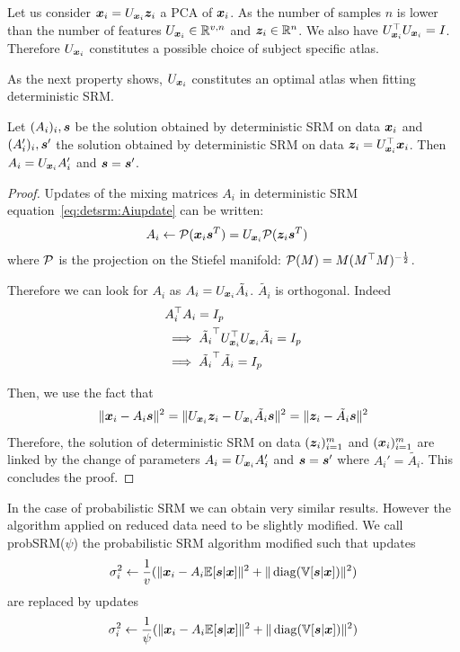 Let us consider $\boldsymbol{x}_i = U_{\boldsymbol{x}_i} \boldsymbol{z}_i$ a PCA of $\boldsymbol{x}_i$. As the number of
samples $n$ is lower than the number of features $U_{\boldsymbol{x}_i} \in \mathbb{R}^{v, n}$ and $\boldsymbol{z}_i \in \mathbb{R}^{n}$.  We also have $U_{\boldsymbol{x}_i}^{\top}U_{\boldsymbol{x}_i} = I$.
Therefore $U_{\boldsymbol{x}_i}$ constitutes a possible choice of subject specific atlas.

As the next property shows, $U_{\boldsymbol{x}_i}$ constitutes an optimal atlas when
fitting deterministic SRM.
\begin{prop}
  Let $(A_i)_i, \boldsymbol{s}$ be the solution obtained by deterministic SRM on data
  $\boldsymbol{x}_i$ and $(A_i')_i, \boldsymbol{s}'$ the solution obtained by deterministic SRM on
  data $\boldsymbol{z}_i = U_{\boldsymbol{x}_i}^{\top} \boldsymbol{x}_i$. Then $A_i = U_{\boldsymbol{x}_i}A_i'$ and $\boldsymbol{s} = \boldsymbol{s}'$. 
\label{prop:optimaldetsrm}
\end{prop}
\begin{proof}
Updates of the mixing matrices $A_i$ in deterministic SRM
equation~\eqref{eq:detsrm:Aiupdate} can be written:
\begin{align}
  A_i &\leftarrow \mathcal{P}(\boldsymbol{x}_i \boldsymbol{s}^T)= U_{\boldsymbol{x}_i}\mathcal{P}(\boldsymbol{z}_i \boldsymbol{s}^T)
  \label{eq:fastdetsrm:Aiupdate}
\end{align}
where $\mathcal{P}$ is the projection on the Stiefel manifold: $\mathcal{P}(M) = M
(M^{\top}M)^{-\frac12}$.


Therefore we can look for $A_i$ as $A_i = U_{\boldsymbol{x}_i} \tilde{A_i}$. $\tilde{A_i}$ is
orthogonal. Indeed
\begin{align}
  &A_i^{\top} A_i = I_p \\
  & \implies \tilde{A_i}^{\top}U_{\boldsymbol{x}_i}^{\top} U_{\boldsymbol{x}_i} \tilde{A_i} = I_p \\
  & \implies \tilde{A_i}^{\top} \tilde{A_i} = I_p
\end{align}

Then, we use the fact that
\begin{align}
  \|\boldsymbol{x}_i - A_i \boldsymbol{s} \|^2 = \| U_{\boldsymbol{x}_i}\boldsymbol{z}_i - U_{\boldsymbol{x}_i}\tilde{A_i} \boldsymbol{s}\|^2 = \| \boldsymbol{z}_i - \tilde{A_i} \boldsymbol{s} \|^2
  \label{eq:equality:xy}
\end{align}
Therefore, the solution of deterministic SRM on data $(\boldsymbol{z}_i)_{i=1}^m$ and
$(\boldsymbol{x}_i)_{i=1}^m$ are linked by the change of parameters $A_i = U_{\boldsymbol{x}_i}A_i'$ and
$\boldsymbol{s} = \boldsymbol{s}'$ where $A_i' = \tilde{A_i}$. This concludes the proof.
\end{proof}

In the case of probabilistic SRM we can obtain very similar results. However the
algorithm applied on reduced data need to be slightly modified.
We call probSRM($\psi$) the probabilistic SRM algorithm modified such that
updates
\begin{align}
\sigma_i^2 \leftarrow \frac1{v} (\| \boldsymbol{x}_i - A_i \mathbb{E}[\boldsymbol{s}|\boldsymbol{x}]\|^2 + \| \operatorname*{diag}(\mathbb{V}[\boldsymbol{s} | \boldsymbol{x}]) \|^2)
\end{align}
are replaced by updates
\begin{align}
  \sigma_i^2 \leftarrow \frac1{\psi} (\| \boldsymbol{x}_i - A_i \mathbb{E}[\boldsymbol{s}|\boldsymbol{x}]\|^2 + \| \operatorname*{diag}(\mathbb{V}[\boldsymbol{s} | \boldsymbol{x}]) \|^2)
\end{align}

